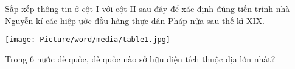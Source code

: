 \documentclass[preview,border=1pt]{standalone}
\begin{document}
	Sắp xếp thông tin ở cột I với cột II sau đây để xác định đúng tiến trình nhà Nguyễn kí các hiệp ước đầu hàng thực dân Pháp nửa sau thế kỉ XIX.\\
\begin{center}
	\texttt{[image: Picture/word/media/table1.jpg]}
\end{center}
Trong 6 nước đế quốc, đế quốc nào sở hữu diện tích thuộc địa lớn nhất?\\
\end{document}
